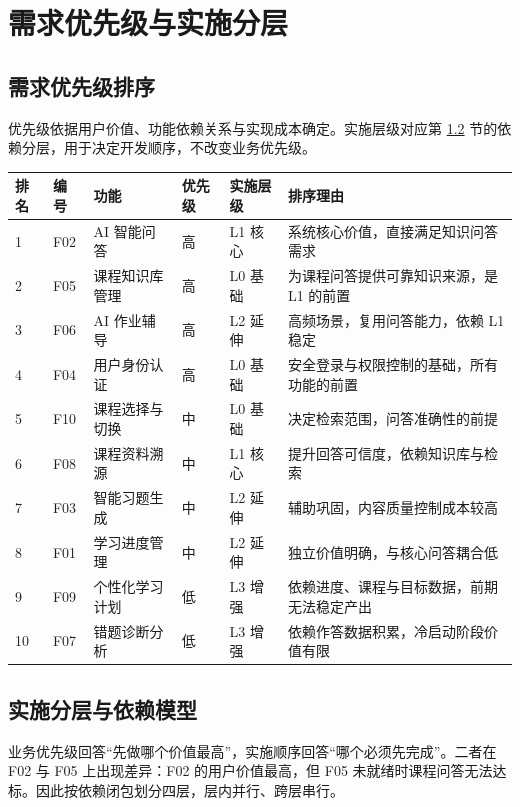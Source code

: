 \documentclass[12pt,a4paper]{ctexart}
\begin{document}
\section{需求优先级与实施分层}

\subsection{需求优先级排序}

优先级依据用户价值、功能依赖关系与实现成本确定。实施层级对应第 \ref{sec:layer} 节的依赖分层，用于决定开发顺序，不改变业务优先级。

\begin{longtable}{@{}C{0.8cm}C{0.9cm}L{3.0cm}C{1.0cm}C{2.6cm}L{5.0cm}@{}}
  \toprule
  \textbf{排名} & \textbf{编号} & \textbf{功能} & \textbf{优先级} & \textbf{实施层级} & \textbf{排序理由} \\
  \midrule
   & F02 & AI 智能问答 & 高 & L1 核心 & 系统核心价值，直接满足知识问答需求 \\
  2 & F05 & 课程知识库管理 & 高 & L0 基础 & 为课程问答提供可靠知识来源，是 L1 的前置 \\
  3 & F06 & AI 作业辅导 & 高 & L2 延伸 & 高频场景，复用问答能力，依赖 L1 稳定 \\
  4 & F04 & 用户身份认证 & 高 & L0 基础 & 安全登录与权限控制的基础，所有功能的前置 \\
  5 & F10 & 课程选择与切换 & 中 & L0 基础 & 决定检索范围，问答准确性的前提 \\
  6 & F08 & 课程资料溯源 & 中 & L1 核心 & 提升回答可信度，依赖知识库与检索 \\
  7 & F03 & 智能习题生成 & 中 & L2 延伸 & 辅助巩固，内容质量控制成本较高 \\
  8 & F01 & 学习进度管理 & 中 & L2 延伸 & 独立价值明确，与核心问答耦合低 \\
  9 & F09 & 个性化学习计划 & 低 & L3 增强 & 依赖进度、课程与目标数据，前期无法稳定产出 \\
  10 & F07 & 错题诊断分析 & 低 & L3 增强 & 依赖作答数据积累，冷启动阶段价值有限 \\
  \bottomrule
\end{longtable}

\subsection{实施分层与依赖模型}
\label{sec:layer}

业务优先级回答“先做哪个价值最高”，实施顺序回答“哪个必须先完成”。二者在 F02 与 F05 上出现差异：F02 的用户价值最高，但 F05 未就绪时课程问答无法达标。因此按依赖闭包划分四层，层内并行、跨层串行。
\end{document}
